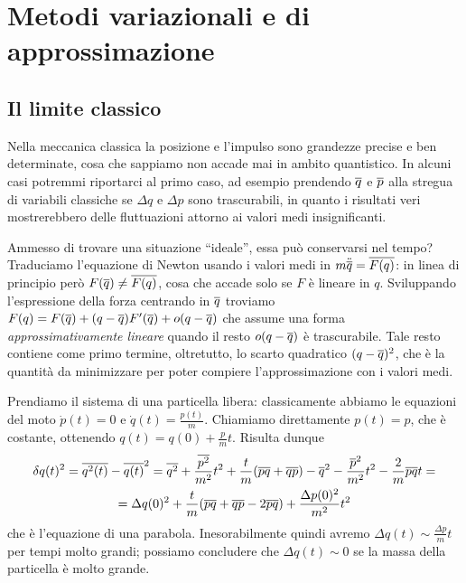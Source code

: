 \chapter{Metodi variazionali e di approssimazione}
\section{Il limite classico}
Nella meccanica classica la posizione e l'impulso sono grandezze precise e ben determinate, cosa che sappiamo non accade mai in ambito quantistico.
In alcuni casi potremmi riportarci al primo caso, ad esempio prendendo $\overline{q}$ e $\overline{p}$ alla stregua di variabili classiche se $\Delta q$ e $\Delta p$ sono trascurabili, in quanto i risultati veri mostrerebbero delle fluttuazioni attorno ai valori medi insignificanti.

Ammesso di trovare una situazione ``ideale'', essa può conservarsi nel tempo?
Traduciamo l'equazione di Newton usando i valori medi in $m\ddot{\overline{q}}=\overline{F(q)}$: in linea di principio però $F(\overline{q})\ne\overline{F(q)}$, cosa che accade solo se $F$ è lineare in $q$.
Sviluppando l'espressione della forza centrando in $\overline{q}$ troviamo $F(q)=F(\overline{q})+(q-\overline{q})F'(\overline{q})+o(q-\overline{q})$ che assume una forma \emph{approssimativamente lineare} quando il resto $o(q-\overline{q})$ è trascurabile.
Tale resto contiene come primo termine, oltretutto, lo scarto quadratico $(q-\overline{q})^2$, che è la quantità da minimizzare per poter compiere l'approssimazione con i valori medi.

Prendiamo il sistema di una particella libera: classicamente abbiamo le equazioni del moto $\dot{p}(t)=0$ e $\dot{q}(t)=\frac{p(t)}m$.
Chiamiamo direttamente $p(t)=p$, che è costante, ottenendo $q(t)=q(0)+\frac{p}{m}t$.
Risulta dunque
\begin{multline}
	\delta q(t)^2=\overline{q^2(t)}-\overline{q(t)}^2=\overline{q^2}+\frac{\overline{p^2}}{m^2}t^2+\frac{t}{m}(\overline{pq}+\overline{qp})-\overline{q}^2-\frac{\overline{p}^2}{m^2}t^2-\frac2{m}\overline{p}\overline{q}t=\\
	=\Delta q(0)^2+\frac{t}{m}(\overline{pq}+\overline{qp}-2\overline{p}\overline{q})+\frac{\Delta p(0)^2}{m^2}t^2
\end{multline}
che è l'equazione di una parabola.
Inesorabilmente quindi avremo $\Delta q(t)\sim\frac{\Delta p}{m}t$ per tempi molto grandi; possiamo concludere che $\Delta q(t)\sim 0$ se la massa della particella è molto grande.

